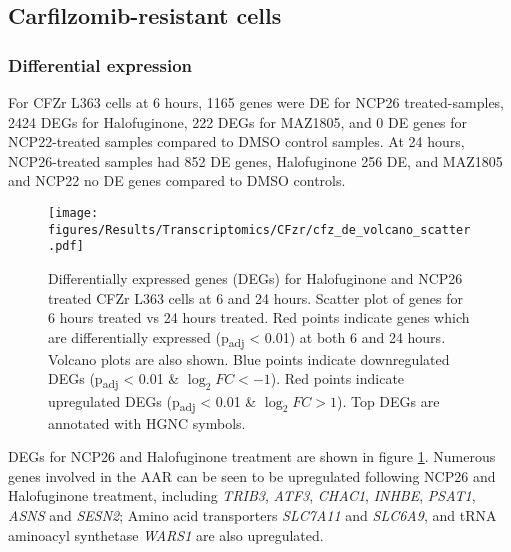 
\afterpage{\clearpage}
\subsection{Carfilzomib-resistant cells}

\subsubsection{Differential expression}
For CFZr L363 cells at 6 hours, 1165 genes were DE for NCP26 treated-samples, 2424 DEGs for Halofuginone, 222 DEGs for MAZ1805, and 0 DE genes for NCP22-treated samples compared to DMSO control samples.
At 24 hours, NCP26-treated samples had 852 DE genes, Halofuginone 256 DE, and MAZ1805 and NCP22 no DE genes compared to DMSO controls.
\begin{figure}[bht]
\centering
\texttt{[image: figures/Results/Transcriptomics/CFzr/cfz\_de\_volcano\_scatter.pdf]}
\caption[Differentially expressed genes CFZr L363 cells]{Differentially expressed genes (DEGs) for Halofuginone and NCP26 treated CFZr L363 cells at 6 and 24 hours.
Scatter plot of genes for 6 hours treated vs 24 hours treated.
Red points indicate genes which are differentially expressed (p\textsubscript{adj} < 0.01) at both 6 and 24 hours.
Volcano plots are also shown.
Blue points indicate downregulated DEGs (p\textsubscript{adj} < 0.01 \& $\log_{2}FC < -1$).
Red points indicate upregulated DEGs (p\textsubscript{adj} < 0.01 \& $\log_{2}FC > 1$).
Top DEGs are annotated with HGNC symbols.
}
\label{fig:cfz_de}
\end{figure}
DEGs for NCP26 and Halofuginone treatment are shown in figure \ref{fig:cfz_de}.
Numerous genes involved in the AAR can be seen to be upregulated following NCP26 and Halofuginone treatment, including \textit{TRIB3}, \textit{ATF3}, \textit{CHAC1}, \textit{INHBE}, \textit{PSAT1}, \textit{ASNS} and \textit{SESN2};
Amino acid transporters \textit{SLC7A11} and \textit{SLC6A9}, and tRNA aminoacyl synthetase \textit{WARS1} are also upregulated.

